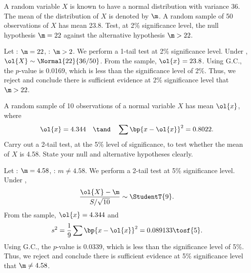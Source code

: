 \begin{problem}
    A random variable $X$ is known to have a normal distribution with variance 36. The mean of the distribution of $X$ is denoted by $\m$. A random sample of 50 observations of $X$ has mean 23.8. Test, at 2\% significance level, the null hypothesis $\m=22$ against the alternative hypothesis $\m>22$.
\end{problem}
\begin{solution}
    Let \nullhyp: $\m = 22$, \althyp: $\m > 2$. We perform a 1-tail test at 2\% significance level. Under \nullhyp, $\ol{X} \sim \Normal{22}{36/50}$. From the sample, $\ol{x} = 23.8$. Using G.C., the $p$-value is 0.0169, which is less than the significance level of 2\%. Thus, we reject \nullhyp{} and conclude there is sufficient evidence at 2\% significance level that $\m > 22$.
\end{solution}

\begin{problem}
    A random sample of 10 observations of a normal variable $X$ has mean $\ol{x}$, where \[\ol{x}=4.344 \quad \tand \quad \sum \bp{x - \ol{x}}^{2}=0.8022.\] Carry out a 2-tail test, at the 5\% level of significance, to test whether the mean of $X$ is 4.58. State your null and alternative hypotheses clearly.
\end{problem}
\begin{solution}
    Let \nullhyp: $\m = 4.58$, \althyp: $m \neq 4.58$. We perform a 2-tail test at 5\% significance level. Under \nullhyp, \[\frac{\ol{X} - \m}{S/\sqrt{10}} \sim \StudentT{9}.\] From the sample, $\ol{x} = 4.344$ and \[s^2 = \frac1{9} \sum \bp{x - \ol{x}}^2 = 0.089133 \tosf{5}.\] Using G.C., the $p$-value is 0.0339, which is less than the significance level of 5\%. Thus, we reject \nullhyp{} and conclude there is sufficient evidence at 5\% significance level that $\m \neq 4.58$.
\end{solution}

